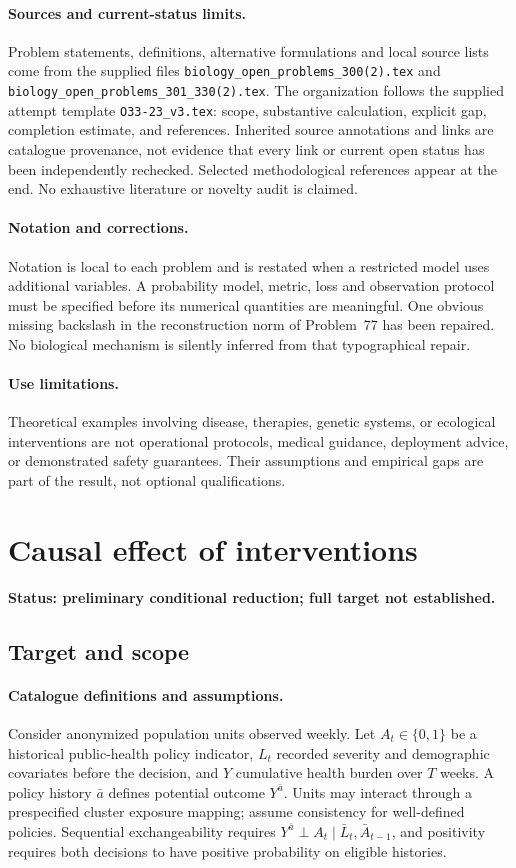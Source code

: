 \documentclass[11pt]{article}
\begin{document}
\paragraph{Sources and current-status limits.}
Problem statements, definitions, alternative formulations and local source lists
come from the supplied files
\texttt{biology\_open\_problems\_300(2).tex} and
\texttt{biology\_open\_problems\_301\_330(2).tex}.
The organization follows the supplied attempt template
\texttt{O33-23\_v3.tex}: scope, substantive calculation, explicit gap,
completion estimate, and references. Inherited source annotations and links are
catalogue provenance, not evidence that every link or current open status has
been independently rechecked. Selected methodological references appear at the
end. No exhaustive literature or novelty audit is claimed.

\paragraph{Notation and corrections.}
Notation is local to each problem and is restated when a restricted model uses
additional variables. A probability model, metric, loss and observation protocol
must be specified before its numerical quantities are meaningful. One obvious
missing backslash in the reconstruction norm of Problem~77 has been repaired.
No biological mechanism is silently inferred from that typographical repair.

\paragraph{Use limitations.}
Theoretical examples involving disease, therapies, genetic systems, or ecological
interventions are not operational protocols, medical guidance, deployment advice,
or demonstrated safety guarantees. Their assumptions and empirical gaps are part
of the result, not optional qualifications.


\section*{Causal effect of interventions}
\label{prob:206}
\noindent\textbf{Status: preliminary conditional reduction; full target not established.}
\subsection{Target and scope}
\paragraph{Catalogue definitions and assumptions.}
Consider anonymized population units observed weekly. Let $A_t\in\{0,1\}$ be a historical public-health policy indicator, $L_t$ recorded severity and demographic covariates before the decision, and $Y$ cumulative health burden over $T$ weeks. A policy history $\bar a$ defines potential outcome $Y^{\bar a}$. Units may interact through a prespecified cluster exposure mapping; assume consistency for well-defined policies. Sequential exchangeability requires $Y^{\bar a}\perp A_t\mid\bar L_t,\bar A_{t-1}$, and positivity requires both decisions to have positive probability on eligible histories.
\end{document}
